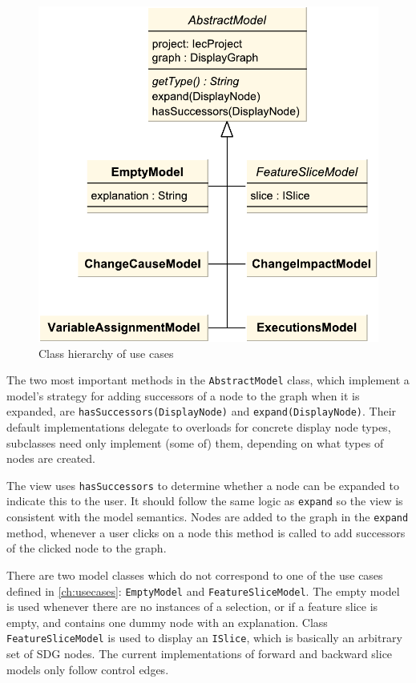 \begin{figure}[htb]
  \centering
    \includegraphics[scale=0.5]{bilder/classes-usecase}
  \caption{Class hierarchy of use cases}
  \label{fig:classes-usecase}
\end{figure}

The two most important methods in the \lstinline|AbstractModel| class, which implement a model's strategy for adding 
successors of a node to the graph when it is expanded, are \lstinline|hasSuccessors(DisplayNode)| and 
\lstinline|expand(DisplayNode)|. Their default implementations delegate to overloads for concrete display node types, 
subclasses need only implement (some of) them, depending on what types of nodes are created.

The view uses \lstinline|hasSuccessors| to determine whether a node can be expanded to indicate this to the user. It 
should follow the same logic as \lstinline|expand| so the view is consistent with the model semantics. Nodes are added 
to the graph in the \lstinline|expand| method, whenever a user clicks on a node this method is called to add successors 
of the clicked node to the graph.

There are two model classes which do not correspond to one of the use cases defined in \autoref{ch:usecases}: 
\lstinline|EmptyModel| and \lstinline|FeatureSliceModel|. The empty model is used whenever there are no instances of a 
selection, or if a feature slice is empty, and contains one dummy node with an explanation. Class 
\lstinline|FeatureSliceModel| is used to display an \lstinline|ISlice|, which is basically an arbitrary set of SDG 
nodes. The current implementations of forward and backward slice models only follow control edges.


